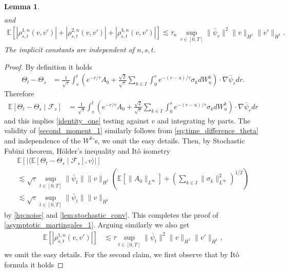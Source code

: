 \documentclass[a4paper,10pt]{amsart}
\newcommand{\expt}[1]{\mathbb{E}\left[#1\right]}
\newtheorem{lemma}[theorem]{Lemma}
\theoremstyle{remark}
\numberwithin{equation}{section}
\begin{document}
\begin{lemma}
\begin{align*}
\end{align*}
and
\begin{align}\label{bound_reminders}
 \mathbb E\!\left[
  |\rho_{s,t}^{1,n}(v,v')|
  +|\rho_{s,t}^{2,n}(v,v')|
  +|\rho_{s,t}^{3,n}(v,v')|
 \right]
 \lesssim \tau_n\,
 \sup_{r\in[0,T]}\|\bar\psi_r\|^2
 \|v\|_{H^1}\|v'\|_{H^1}.
\end{align}
The implicit constants are independent of $n,s,t$.
\end{lemma}
\begin{proof}
By definition it holds
    \begin{align}\label{eq:time_difference_theta}
        \Theta_t-\Theta_s&=\frac{1}{\sqrt{\tau}}\int_s^t  \left(e^{-r/\tau}A_0+\frac{\sqrt{2}}{\sqrt{\tau}}\sum_{k\in I}\int_0^r e^{-(r-u)/\tau}\sigma_k dW^k_u \right)\cdot\nabla\bar{\psi}_r dr.
    \end{align}
Therefore
    \begin{align*}
     \mathbb{E}\left[\Theta_t-\Theta_s\mid\mathcal{F}_s\right]&=  \frac{1}{\sqrt{\tau}}\int_s^t  \left(e^{-r/\tau}A_0+\frac{\sqrt{2}}{\sqrt{\tau}}\sum_{k\in I}\int_0^s e^{-(r-u)/\tau}\sigma_k dW^k_u \right)\cdot\nabla\bar{\psi}_r dr
    \end{align*}
    and this implies \eqref{identity_one} testing against $v$ and integrating by parts. 
    The validity of \eqref{second_moment_1} similarly follows from \eqref{eq:time_difference_theta} and independence of the $W^k$'s, we omit the easy details.
    Then, by Stochastic Fubini theorem, H\"older's inequality and It\^o isometry 
    \begin{multline*}
        \expt{\left\lvert \langle\mathbb{E}\left[\Theta_t-\Theta_s\mid\mathcal{F}_s\right],v\rangle\right\rvert}\\ \lesssim \sqrt{\tau}\sup_{t\in [0,T]}\|\bar{\psi}_t\|\|v\|_{H^1}\left(\mathbb{E}[\|A_0\|_{L^\infty}]+\left(\sum_{k\in I}\|\sigma_k\|_{L^{\infty}}^2\right)^{1/2}\right)\\  \lesssim \sqrt{\tau}\sup_{t\in [0,T]}\|\bar{\psi}_t\|\|v\|_{H^1}
    \end{multline*}
    by \cref{hp:noise} and \cref{lem:stochastic_conv}. This completes the proof of \eqref{asymptotic_martingales_1}.
Arguing similarly we also get
\begin{align*}
    \mathbb{E}\left[|\rho^{1,n}_{s,t}(v,v')|\right]& \lesssim \tau\sup_{t\in [0,T]}\|\bar{\psi}_t\|^2\|v\|_{H^1}\|v'\|_{H^1},
\end{align*}
    we omit the easy details. For the second claim, we first observe that by It\^o formula it holds

\end{proof}
\end{document}
